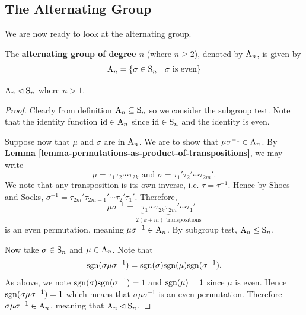 \newpage

\subsection{The Alternating Group}
We are now ready to look at the alternating group.
\begin{definition}
    The \textbf{alternating group of degree $n$} (where $n \geq 2$), denoted by $\mathrm{A}_{n}$, is given by
    \[
        \mathrm{A}_{n} = \left\{\sigma \in \mathrm{S}_{n} \ | \ \sigma \text{ is even}\right\}
    \]
\end{definition}

\begin{proposition}\label{prop-An-normal-subgroup-of-Sn}
    $\mathrm{A}_{n} \lhd \mathrm{S}_{n}$ where $n > 1$.
\end{proposition}
\begin{proof}
    Clearly from definition $\mathrm{A}_{n} \subseteq \mathrm{S}_{n}$ so we consider the subgroup test. Note that the identity function $\mathrm{id} \in \mathrm{A}_{n}$ since $\mathrm{id} \in \mathrm{S}_{n}$ and the identity is even.

    Suppose now that $\mu$ and $\sigma$ are in $\mathrm{A}_{n}$. We are to show that $\mu\sigma^{-1} \in \mathrm{A}_{n}$. By \textbf{Lemma \ref{lemma-permutations-as-product-of-transpositions}}, we may write
    \[
        \mu = \tau_1\tau_2\cdots\tau_{2k} \text{ and } \sigma = \tau_1'\tau_2'\cdots\tau_{2m}'.
    \]
    We note that any transposition is its own inverse, i.e. $\tau = \tau^{-1}$. Hence by Shoes and Socks, $\sigma^{-1} = \tau_{2m}'\tau_{2m-1}'\cdots\tau_2'\tau_1'$. Therefore,
    \[
        \mu\sigma^{-1} = \underbrace{\tau_1\cdots\tau_{2k}\tau_{2m}'\cdots\tau_1'}_{2(k+m) \text{ transpositions}}
    \]
    is an even permutation, meaning $\mu\sigma^{-1} \in \mathrm{A}_{n}$. By subgroup test, $\mathrm{A}_{n} \leq \mathrm{S}_{n}$.
    
    Now take $\sigma \in \mathrm{S}_{n}$ and $\mu \in \mathrm{A}_{n}$. Note that
    \[
        \mathrm{sgn}(\sigma\mu\sigma^{-1}) = \mathrm{sgn}(\sigma)\mathrm{sgn}(\mu)\mathrm{sgn}(\sigma^{-1}).
    \]
    As above, we note $\mathrm{sgn}(\sigma)\mathrm{sgn}(\sigma^{-1}) = 1$ and $\mathrm{sgn}(\mu) = 1$ since $\mu$ is even. Hence $\mathrm{sgn}(\sigma\mu\sigma^{-1}) = 1$ which means that $\sigma\mu\sigma^{-1}$ is an even permutation. Therefore $\sigma\mu\sigma^{-1} \in \mathrm{A}_{n}$, meaning that $\mathrm{A}_{n} \lhd \mathrm{S}_{n}$.
\end{proof}

\newpage

